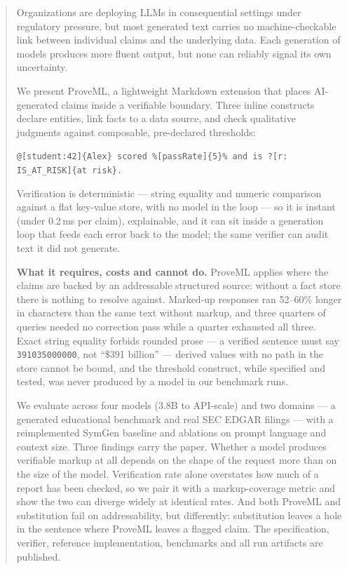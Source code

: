 \documentclass[11pt,a4paper]{article}
\begin{document}
\begin{abstract}
Organizations are deploying LLMs in consequential settings under regulatory pressure, but most generated text carries no machine-checkable link between individual claims and the underlying data. Each generation of models produces more fluent output, but none can reliably signal its own uncertainty.

\vspace{0.4em}
We present ProveML, a lightweight Markdown extension that places AI-generated claims inside a verifiable boundary. Three inline constructs declare entities, link facts to a data source, and check qualitative judgments against composable, pre-declared thresholds:

\vspace{0.3em}
{\small\texttt{@[student:42]\{Alex\} scored \%[passRate]\{5\}\% and is ?[r: IS\_AT\_RISK]\{at risk\}.}}

\vspace{0.3em}
\noindent Verification is deterministic --- string equality and numeric comparison against a flat key-value store, with no model in the loop --- so it is instant (under 0.2\,ms per claim), explainable, and it can sit inside a generation loop that feeds each error back to the model; the same verifier can audit text it did not generate.

\vspace{0.4em}
\textbf{What it requires, costs and cannot do.} ProveML applies where the claims are backed by an addressable structured source: without a fact store there is nothing to resolve against. Marked-up responses ran 52--60\% longer in characters than the same text without markup, and three quarters of queries needed no correction pass while a quarter exhausted all three. Exact string equality forbids rounded prose --- a verified sentence must say \texttt{391035000000}, not ``\$391 billion'' --- derived values with no path in the store cannot be bound, and the threshold construct, while specified and tested, was never produced by a model in our benchmark runs.

\vspace{0.4em}
We evaluate across four models (3.8B to API-scale) and two domains --- a generated educational benchmark and real SEC EDGAR filings --- with a reimplemented SymGen baseline and ablations on prompt language and context size. Three findings carry the paper. Whether a model produces verifiable markup at all depends on the shape of the request more than on the size of the model. Verification rate alone overstates how much of a report has been checked, so we pair it with a markup-coverage metric and show the two can diverge widely at identical rates. And both ProveML and substitution fail on addressability, but differently: substitution leaves a hole in the sentence where ProveML leaves a flagged claim. The specification, verifier, reference implementation, benchmarks and all run artifacts are published.
\end{abstract}
\end{document}
